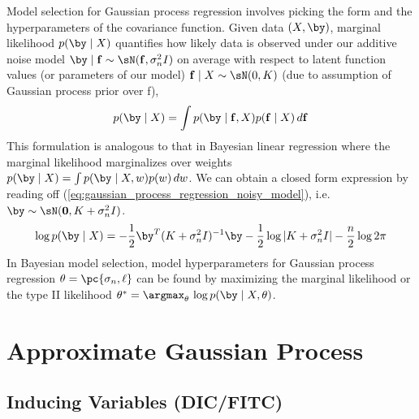 \documentclass[11pt]{article}
\renewcommand\bf{\ensuremath{\mathbf{f}}}
\begin{document}
Model selection for Gaussian process regression involves picking the form and the hyperparameters of the covariance function. Given data $(X,\by)$, marginal likelihood $p(\by\mid X)$ quantifies how likely data is observed under our additive noise model $\by\mid \bf \sim \sN(\bf,\sigma_n^2 I)$ on average with respect to latent function values (or parameters of our model) $\bf\mid X \sim \sN(0,K)$ (due to assumption of Gaussian process prior over f),
\begin{align}
    p(\by\mid X)
        = \int p(\by\mid \bf,X) p(\bf\mid X) \, d\bf
\end{align}
This formulation is analogous to that in Bayesian linear regression where the marginal likelihood marginalizes over weights $p(\by\mid X) = \int p(\by\mid X,w)p(w) \, dw$. We can obtain a closed form expression by reading off (\ref{eq:gaussian_process_regression_noisy_model}), i.e. $\by \sim \sN(\mathbf{0}, K+\sigma_n^2 I)$. 
\begin{align}
    \log p(\by\mid X)
        = -\frac{1}{2} \by^T  (K+\sigma_n^2 I)^{-1}\by - \frac{1}{2} \log |K+\sigma_n^2I| - \frac{n}{2} \log 2\pi 
    \label{eq:gp_regression_marginal_likelihood}
\end{align}
In Bayesian model selection, model hyperparameters for Gaussian process regression $\theta = \pc{\sigma_n, \ell}$ can be found by maximizing the marginal likelihood or the type II likelihood $\theta^* = \argmax_{\theta}\, \log p(\by\mid X, \theta)$.





\section{Approximate Gaussian Process}

\subsection{Inducing Variables (DIC/FITC)}
\end{document}
